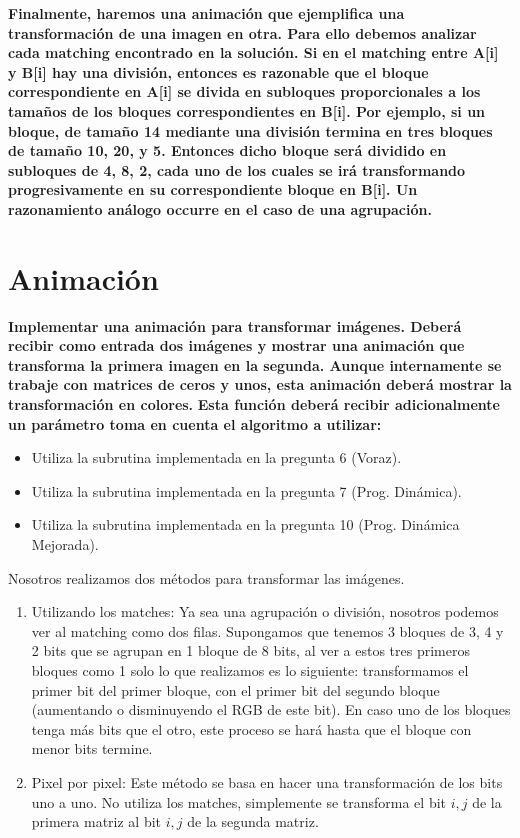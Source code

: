 \documentclass[12pt,a4,paper]{article}
\begin{document}
\textbf{Finalmente, haremos una animaci\'on que ejemplifica una transformaci\'on de una imagen en
otra. Para ello debemos analizar cada matching encontrado en la soluci\'on. Si en el matching
entre A[i] y B[i] hay una divisi\'on, entonces es razonable que el bloque correspondiente en
A[i] se divida en subloques proporcionales a los tamaños de los bloques correspondientes en
B[i]. Por ejemplo, si un bloque, de tamaño 14 mediante una divisi\'on termina en tres bloques
de tamaño 10, 20, y 5. Entonces dicho bloque ser\'a dividido en subloques de 4, 8, 2, cada uno
de los cuales se ir\'a transformando progresivamente en su correspondiente bloque en B[i].
Un razonamiento an\'alogo occurre en el caso de una agrupaci\'on.}

\section{Animaci\'on}

\textbf{Implementar una animaci\'on para transformar im\'agenes. Deber\'a recibir como entrada dos im\'agenes y mostrar una animaci\'on que transforma la primera
imagen en la segunda. Aunque internamente se trabaje con matrices de ceros y unos, esta
animaci\'on deber\'a mostrar la transformaci\'on en colores.} \newline
\textbf{Esta funci\'on deber\'a recibir adicionalmente un par\'ametro toma en cuenta el algoritmo a
utilizar:}

\begin{itemize}
    \item Utiliza la subrutina implementada en la pregunta 6 (Voraz).
    \item Utiliza la subrutina implementada en la pregunta 7 (Prog. Din\'amica).
    \item Utiliza la subrutina implementada en la pregunta 10 (Prog. Din\'amica Mejorada).
\end{itemize}

Nosotros realizamos dos m\'etodos para transformar las im\'agenes.

\begin{enumerate}
    \item Utilizando los matches: Ya sea una agrupaci\'on o divisi\'on, nosotros podemos ver al matching como dos filas. Supongamos que tenemos 3 bloques de 3, 4 y 2 bits que se agrupan en 1 bloque de 8 bits, al ver a estos tres primeros bloques como 1 solo lo que realizamos es lo siguiente: transformamos el primer bit del primer bloque, con el primer bit del segundo bloque (aumentando o disminuyendo el RGB de este bit). En caso uno de los bloques tenga m\'as bits que el otro, este proceso se har\'a hasta que el bloque con menor bits termine.
    \item Pixel por pixel: Este m\'etodo se basa en hacer una transformaci\'on de los bits uno a uno. No utiliza los matches, simplemente se transforma el bit $i, j$ de la primera matriz al bit $i, j$ de la segunda matriz.
\end{enumerate}
\end{document}

